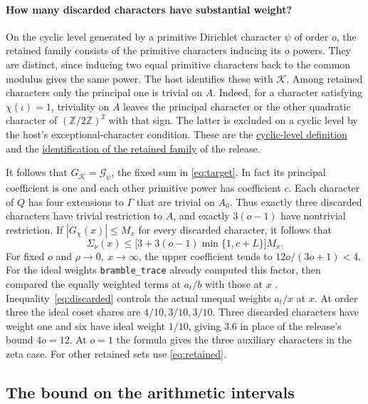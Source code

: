 \documentclass[11pt,letterpaper]{article}
\newcommand{\Z}{\mathbb Z}
\newcommand{\src}[2]{\href{https://github.com/leanprover-community/riemann-hypothesis/blob/main/src/#1.lean}{#2}}
\numberwithin{equation}{section}
\begin{document}
\paragraph{How many discarded characters have substantial weight?}
On the cyclic level generated by a primitive Dirichlet character \(\psi\) of order \(o\), the retained family consists of the primitive characters inducing its \(o\) powers. They are distinct, since inducing two equal primitive characters back to the common modulus gives the same power. The host identifies these with \(\mathcal K\). Among retained characters only the principal one is trivial on \(A\). Indeed, for a character satisfying \(\chi(\iota)=1\), triviality on \(A\) leaves the principal character or the other quadratic character of \((\Z/2\Z)^2\) with that sign. The latter is excluded on a cyclic level by the host's exceptional-character condition. These are the
\src{Formalism/SharpRestriction/RamificationFrobenius/TotientGaloisClasses/ExplicitFormulaErrorOfHostConditions}{cyclic-level definition}
and the \src{Development/AutomorphicArithmetic/PrimitiveCosets/GmAEq}{identification of the retained family} of the release.

It follows that \(G_{\mathcal K}=\mathcal G_\psi\), the fixed sum in \eqref{eq:target}. In fact its principal coefficient is one and each other primitive power has coefficient \(c\). Each character of \(Q\) has four extensions to \(\Gamma\) that are trivial on \(A_0\). Thus exactly three discarded characters have trivial restriction to \(A\), and exactly \(3(o-1)\) have nontrivial restriction. If \(|G_\chi(x)|\le M_x\) for every discarded character, it follows that
\begin{equation}\label{eq:discarded}
       \Sigma_\nu(x)\le
       \big[3+3(o-1)\min\{1,c+L\}\big]M_x .
\end{equation}
For fixed \(o\) and \(\rho\to0,\ x\to\infty\), the upper coefficient tends to \(12o/(3o+1)<4\). For the ideal weights \texttt{bramble\_trace} already computed this factor, then compared the equally weighted terms at \(a_t/b\) with those at \(x\) \cite{bramble}. Inequality~\eqref{eq:discarded} controls the actual unequal weights \(a_t/x\) at \(x\). At order three the ideal coset shares are \(4/10,3/10,3/10\). Three discarded characters have weight one and six have ideal weight \(1/10\), giving \(3.6\) in place of the release's bound \(4o=12\). At \(o=1\) the formula gives the three auxiliary characters in the zeta case. For other retained sets use \eqref{eq:retained}.

\subsection*{The bound on the arithmetic intervals}
\end{document}
